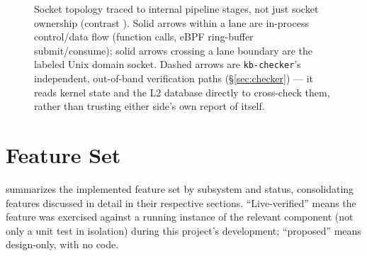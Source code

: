 \documentclass{article}
\begin{document}
\begin{figure}[t]
\caption{Socket topology traced to internal pipeline stages, not just
socket ownership (contrast ). Solid arrows within a
lane are in-process control/data flow (function calls, eBPF ring-buffer
submit/consume); solid arrows crossing a lane boundary are the labeled
Unix domain socket. Dashed arrows are \texttt{kb-checker}'s independent,
out-of-band verification paths (\S\ref{sec:checker}) --- it reads
kernel state and the L2 database directly to cross-check them, rather
than trusting either side's own report of itself.}
\label{fig:pipeline}
\end{figure}

\section{Feature Set}
\label{sec:features}

 summarizes the implemented feature set by
subsystem and status, consolidating features discussed in detail in
their respective sections. ``Live-verified'' means the feature was
exercised against a running instance of the relevant component (not
only a unit test in isolation) during this project's development;
``proposed'' means design-only, with no code.
\end{document}
